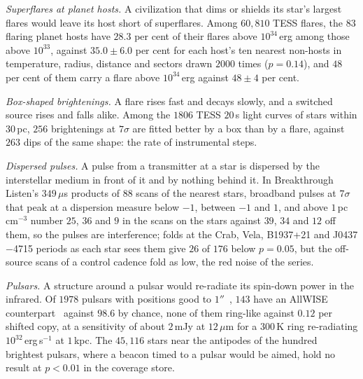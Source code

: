 \documentclass[3p,11pt]{elsarticle}
\begin{document}
\emph{Superflares at planet hosts.} A civilization that dims or shields its star's
largest flares would leave its host short of superflares. Among $60{,}810$ TESS flares,
the $83$ flaring planet hosts have $28.3$ per cent of their flares above $10^{34}$\,erg
among those above $10^{33}$, against $35.0\pm6.0$ per cent for each host's ten nearest
non-hosts in temperature, radius, distance and sectors drawn $2000$ times ($p=0.14$), and
$48$ per cent of them carry a flare above $10^{34}$\,erg against $48\pm4$ per cent.

\emph{Box-shaped brightenings.} A flare rises fast and decays slowly, and a switched
source rises and falls alike. Among the $1806$ TESS $20$\,s light curves of stars within
$30$\,pc, $256$ brightenings at $7\sigma$ are fitted better by a box than by a flare,
against $263$ dips of the same shape: the rate of instrumental steps.

\emph{Dispersed pulses.} A pulse from a transmitter at a star is dispersed by the
interstellar medium in front of it and by nothing behind it. In Breakthrough Listen's
$349\,\mu$s products of $88$ scans of the nearest stars, broadband pulses at $7\sigma$ that
peak at a dispersion measure below $-1$, between $-1$ and $1$, and above $1$\,pc\,cm$^{-3}$
number $25$, $36$ and $9$ in the scans on the stars against $39$, $34$ and $12$ off them, so
the pulses are interference; folds at the Crab, Vela, B1937+21 and J0437$-$4715 periods
as each star sees them give $26$ of $176$ below $p=0.05$, but the off-source scans of a
control cadence fold as low, the red noise of the series.

\emph{Pulsars.} A structure around a pulsar would re-radiate its spin-down power in the
infrared. Of $1978$ pulsars with positions good to $1''$~\cite{Manchester2005}, $143$
have an AllWISE counterpart~\cite{Wright2010} against $98.6$ by chance, none of them ring-like
against $0.12$ per shifted copy, at a sensitivity of about $2$\,mJy at $12\,\mu$m for a
$300$\,K ring re-radiating $10^{32}$\,erg\,s$^{-1}$ at $1$\,kpc. The $45{,}116$ stars near the
antipodes of the hundred brightest pulsars, where a beacon timed to a pulsar would be
aimed, hold no result at $p<0.01$ in the coverage store.
\end{document}
